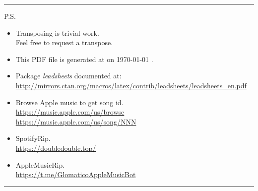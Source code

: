 \documentclass{article}
\begin{document}




\label{lbtoc}
\newcommand{\cursec}[0]{}
\tableofcontents
\bigskip
\hrule
\bigskip
P.S.
\begin{itemize}
  \item Transposing is trivial work. \\ Feel free to request a transpose.
  \item This PDF file is generated at \textbraceleft{} \currenttime{} \textbraceright{} on \textbraceleft{} \today{} \textbraceright{}.
  \item Package \textit{leadsheets} documented at: \\ \url{http://mirrors.ctan.org/macros/latex/contrib/leadsheets/leadsheets_en.pdf}
  \item Browse Apple music to get song id. \\ \url{https://music.apple.com/us/browse} \\ \url{https://music.apple.com/us/song/NNN}
  \item SpotifyRip. \\ \url{https://doubledouble.top/}
  \item AppleMusicRip. \\ \url{https://t.me/GlomaticoAppleMusicBot}
\end{itemize}
\hrule
\end{document}
